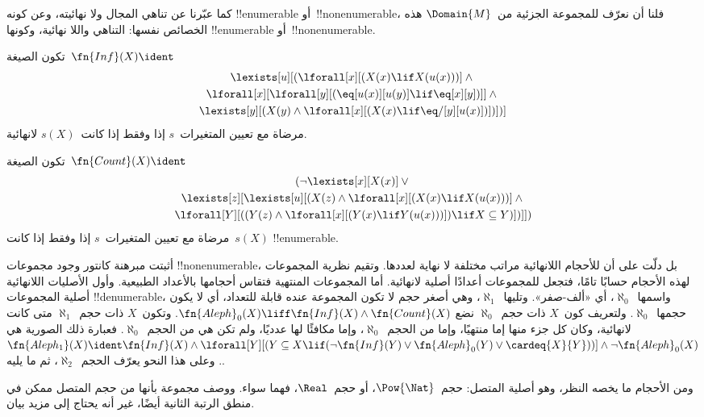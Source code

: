 \documentclass[../../../include/open-logic-section]{subfiles}
\begin{document}


\begin{explain}
كما عبّرنا عن تناهي المجال ولا نهائيته، وعن كونه !!{enumerable}
أو~!!{nonenumerable}، فلنا أن نعرّف للمجموعة الجزئية
من~$\Domain{M}$ هذه الخصائص نفسها: التناهي واللا نهائية،
وكونها !!{enumerable} أو~!!{nonenumerable}.
\end{explain}

\begin{prop}
تكون الصيغة~$\fn{Inf}(X) \ident$
\begin{multline*}
\lexists[u][(\lforall[x][(X(x) \lif X(u(x)))] \land {}\\
  \lforall[x][\lforall[y][(\eq[u(x)][u(y)] \lif 
      \eq[x][y])]] \land {} \\\lexists[y][(X(y) \land \lforall[x][(X(x)
      \lif \eq/[y][u(x)])])])]
\end{multline*}
مرضاة مع تعيين المتغيرات~$s$ إذا وفقط إذا كانت~$s(X)$ لانهائية.
\end{prop}

\begin{prop}
تكون الصيغة~$\fn{Count}(X) \ident $
\begin{multline*}
(\lnot\lexists[x][X(x)] \lor {}\\
\lexists[z][\lexists[u][(X(z) \land 
    \lforall[x][(X(x) \lif X(u(x)))] \land {} \\ \lforall[Y][((Y(z) \land
      \lforall[x][(Y(x) \lif Y(u(x)))]) \lif X \subseteq Y)])]])
\end{multline*}
مرضاة مع تعيين المتغيرات~$s$ إذا وفقط إذا كانت~$s(X)$ !!{enumerable}.
\end{prop}

أثبتت مبرهنة كانتور وجود مجموعات !!{nonenumerable}، بل دلّت
على أن للأحجام اللانهائية مراتب مختلفة لا نهاية لعددها.
وتقيم نظرية المجموعات لهذه الأحجام حسابًا تامًا، فتجعل للمجموعات
أعدادًا أصلية لانهائية. أما المجموعات المنتهية فتقاس أحجامها
بالأعداد الطبيعية. وأول الأصليات اللانهائية أصلية المجموعات
!!{denumerable}، واسمها~$\aleph_0$، أي «ألف-صفر».
وتليها~$\aleph_1$، وهي أصغر حجم لا تكون المجموعة عنده قابلة
للتعداد، أي لا يكون حجمها~$\aleph_0$.
ولتعريف كون~$X$ ذات حجم~$\aleph_0$ نضع
$\fn{Aleph}_0(X) \liff \fn{Inf}(X) \land \fn{Count}(X)$.
وتكون~$X$ ذات حجم~$\aleph_1$ متى كانت لانهائية، وكان كل جزء
منها إما منتهيًا، وإما من الحجم~$\aleph_0$، وإما مكافئًا لها
عدديًا، ولم تكن هي من الحجم~$\aleph_0$.
فعبارة ذلك الصورية هي
$\fn{Aleph_1}(X) \ident \fn{Inf}(X) \land
\lforall[Y][(Y \subseteq X \lif
  (\lnot\fn{Inf}(Y) \lor \fn{Aleph}_0(Y) \lor \cardeq{X}{Y}))] \land \lnot
\fn{Aleph}_0(X)$. وعلى هذا النحو يعرّف الحجم~$\aleph_2$،
ثم ما يليه.

ومن الأحجام ما يخصه النظر، وهو أصلية المتصل:
حجم~$\Pow{\Nat}$، أو حجم~$\Real$، فهما سواء.
ووصف مجموعة بأنها من حجم المتصل ممكن في منطق الرتبة الثانية
أيضًا، غير أنه يحتاج إلى مزيد بيان.
\end{document}
